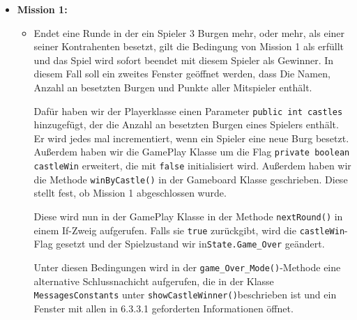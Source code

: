 \begin{itemize}

\item \textbf{Mission 1:}
	\begin{itemize}
	\item[]
		Endet eine Runde in der ein Spieler 3 Burgen mehr, oder mehr, als einer seiner Kontrahenten besetzt, gilt die Bedingung von Mission 1 als erfüllt und das Spiel wird sofort beendet mit diesem Spieler als Gewinner. In diesem Fall soll 	
		ein zweites Fenster ge\"offnet werden, dass Die Namen, Anzahl an besetzten Burgen und Punkte aller Mitspieler enthält.

		Dafür haben wir der Playerklasse einen Parameter \texttt{public int castles} hinzugefügt, der die Anzahl an besetzten Burgen eines Spielers enthält. Er wird jedes mal incrementiert, wenn ein Spieler eine neue Burg besetzt. Außerdem 
		haben wir die GamePlay Klasse um die Flag \texttt{private boolean castleWin} erweitert, die mit \texttt{false} initialisiert wird.
		Außerdem haben wir die Methode \texttt{winByCastle()} in der Gameboard Klasse geschrieben. Diese stellt fest, ob Mission 1 abgeschlossen wurde.
		
		Diese wird nun in der GamePlay Klasse in der Methode \texttt{nextRound()} in einem If-Zweig aufgerufen. Falls sie \texttt{true} zurückgibt, wird die \texttt{castleWin}-Flag gesetzt und der Spielzustand wir in\texttt{State.Game\_Over} 
		geändert.

		Unter diesen Bedingungen wird in der \texttt{game\_Over\_Mode()}-Methode eine alternative Schlussnachicht aufgerufen, die in der Klasse \texttt{MessagesConstants} unter \texttt {showCastleWinner()}beschrieben ist und ein Fenster mit 
		allen in 6.3.3.1 geforderten Informationen \"offnet.
	\end{itemize}

\end{itemize}

\clearpage

